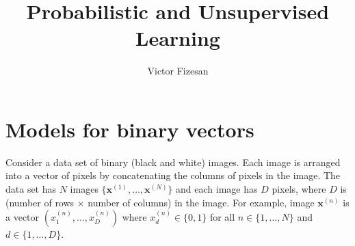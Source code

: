 \documentclass{article}
\title{Probabilistic and Unsupervised Learning}
\author{Victor Fizesan}
\begin{document}
\maketitle

\section{Models for binary vectors}

Consider a data set of binary (black and white) images. Each image is arranged into a vector of pixels by concatenating the columns of pixels in the image. The data set has $N$ images $\{\mathbf{x}^{(1)}, \dots, \mathbf{x}^{(N)}\}$ and each image has $D$ pixels, where $D$ is (number of rows $\times$ number of columns) in the image. For example, image $\mathbf{x}^{(n)}$ is a vector $(x_1^{(n)}, \dots, x_D^{(n)})$ where $x_d^{(n)} \in \{0, 1\}$ for all $n \in \{1, \dots, N\}$ and $d \in \{1, \dots, D\}$.
\end{document}
